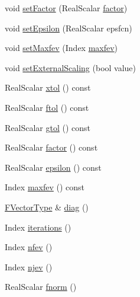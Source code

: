 \begin{DoxyCompactItemize}
\item 
void \hyperlink{class_eigen_1_1_levenberg_marquardt_a3054eeba042b197ae8d415729770db69}{set\+Factor} (Real\+Scalar \hyperlink{class_eigen_1_1_levenberg_marquardt_a282e28b8331376b9875429dab1e280ba}{factor})
\item 
void \hyperlink{class_eigen_1_1_levenberg_marquardt_a3e13f6631ae59be984ee1ea196899cd7}{set\+Epsilon} (Real\+Scalar epsfcn)
\item 
void \hyperlink{class_eigen_1_1_levenberg_marquardt_af072d0f89c44415d8ed284df8b4a634a}{set\+Maxfev} (Index \hyperlink{class_eigen_1_1_levenberg_marquardt_a495894dde1fedfba97721f6b4a076901}{maxfev})
\item 
void \hyperlink{class_eigen_1_1_levenberg_marquardt_a4af7d41545ec5908485357493839e6f6}{set\+External\+Scaling} (bool value)
\item 
Real\+Scalar \hyperlink{class_eigen_1_1_levenberg_marquardt_a25a7629ea877d8f08670536b3d234897}{xtol} () const
\item 
Real\+Scalar \hyperlink{class_eigen_1_1_levenberg_marquardt_a957ac071ec775779bb03d10b463ddfbc}{ftol} () const
\item 
Real\+Scalar \hyperlink{class_eigen_1_1_levenberg_marquardt_a18597c537ec7d492ee6d43788178e458}{gtol} () const
\item 
Real\+Scalar \hyperlink{class_eigen_1_1_levenberg_marquardt_a282e28b8331376b9875429dab1e280ba}{factor} () const
\item 
Real\+Scalar \hyperlink{class_eigen_1_1_levenberg_marquardt_aac799068926ca0bc3387b2dc5c0eb113}{epsilon} () const
\item 
Index \hyperlink{class_eigen_1_1_levenberg_marquardt_a495894dde1fedfba97721f6b4a076901}{maxfev} () const
\item 
\hyperlink{group___core___module}{F\+Vector\+Type} \& \hyperlink{class_eigen_1_1_levenberg_marquardt_a6e237ca1f23cdf5caa98fe23c6bcf464}{diag} ()
\item 
Index \hyperlink{class_eigen_1_1_levenberg_marquardt_aeb094683f0abe9c29ee89be0677de744}{iterations} ()
\item 
Index \hyperlink{class_eigen_1_1_levenberg_marquardt_ad9563c6abeb33c0aba82e55fd72c64a6}{nfev} ()
\item 
Index \hyperlink{class_eigen_1_1_levenberg_marquardt_a31bedcc92106ed170fde5750559a62a5}{njev} ()
\item 
Real\+Scalar \hyperlink{class_eigen_1_1_levenberg_marquardt_ac30c5ce96ac91663b287b2ba7ec7c712}{fnorm} ()
\item 

\end{DoxyCompactItemize}
